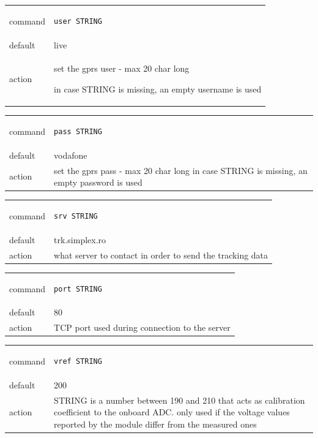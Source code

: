 \documentclass[a4paper,twoside]{refart}
\begin{document}
\begin{tabular}{ |l|p{8cm}| }
    \hline
        command & 
\begin{lstlisting}
user STRING
\end{lstlisting} \\
        default & live \\
        action & 
set the gprs user  - max 20 char long

in case STRING is missing, an empty username is used  \\ \hline
\end{tabular}


\begin{tabular}{ |l|p{8cm}| }
    \hline
        command & 
\begin{lstlisting}
pass STRING
\end{lstlisting} \\
        default & vodafone \\
        action & 
set the gprs pass - max 20 char long
in case STRING is missing, an empty password is used  \\ \hline
\end{tabular}


\begin{tabular}{ |l|p{8cm}| }
    \hline
        command & 
\begin{lstlisting}
srv STRING
\end{lstlisting} \\
        default & trk.simplex.ro \\
        action & 
what server to contact in order to send the tracking data \\ \hline
\end{tabular}


\begin{tabular}{ |l|p{8cm}| }
    \hline
        command & 
\begin{lstlisting}
port STRING
\end{lstlisting} \\
        default & 80 \\
        action & 
TCP port used during connection to the server  \\ \hline
\end{tabular}


\begin{tabular}{ |l|p{8cm}| }
    \hline
        command & 
\begin{lstlisting}
vref STRING
\end{lstlisting} \\
        default & 200 \\
        action & 
STRING is a number between 190 and 210 that acts as calibration coefficient to the onboard ADC. only used if the voltage values reported by the module differ from the measured ones \\ \hline
\end{tabular}
\end{document}
